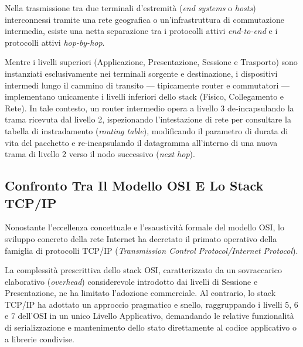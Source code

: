 \documentclass[11pt, a4paper]{article}
\begin{document}
Nella trasmissione tra due terminali d'estremità (\emph{end systems} o \emph{hosts}) interconnessi tramite una rete geografica o un'infrastruttura di commutazione intermedia, esiste una netta separazione tra i protocolli attivi \emph{end-to-end} e i protocolli attivi \emph{hop-by-hop}.


Mentre i livelli superiori (Applicazione, Presentazione, Sessione e Trasporto) sono instanziati esclusivamente nei terminali sorgente e destinazione, i dispositivi intermedi lungo il cammino di transito — tipicamente router e commutatori — implementano unicamente i livelli inferiori dello stack (Fisico, Collegamento e Rete). In tale contesto, un router intermedio opera a livello 3 de-incapsulando la trama ricevuta dal livello 2, ispezionando l'intestazione di rete per consultare la tabella di instradamento (\emph{routing table}), modificando il parametro di durata di vita del pacchetto e re-incapsulando il datagramma all'interno di una nuova trama di livello 2 verso il nodo successivo (\emph{next hop}).

\subsection{Confronto Tra Il Modello OSI E Lo Stack TCP/IP}

Nonostante l'eccellenza concettuale e l'esaustività formale del modello OSI, lo sviluppo concreto della rete Internet ha decretato il primato operativo della famiglia di protocolli TCP/IP (\emph{Transmission Control Protocol/Internet Protocol}).

La complessità prescrittiva dello stack OSI, caratterizzato da un sovraccarico elaborativo (\emph{overhead}) considerevole introdotto dai livelli di Sessione e Presentazione, ne ha limitato l'adozione commerciale. Al contrario, lo stack TCP/IP ha adottato un approccio pragmatico e snello, raggruppando i livelli 5, 6 e 7 dell'OSI in un unico Livello Applicativo, demandando le relative funzionalità di serializzazione e mantenimento dello stato direttamente al codice applicativo o a librerie condivise.

\end{document}

